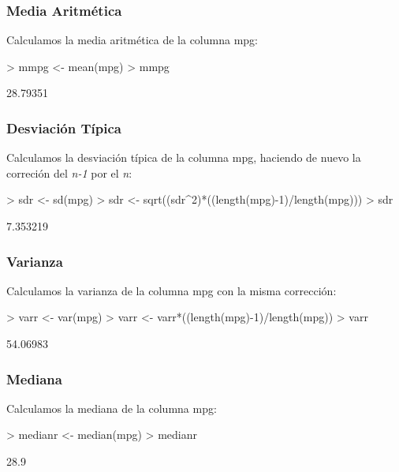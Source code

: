 \documentclass [a4paper] {article}
\begin{document}
\subsubsection{Media Aritmética}
Calculamos la media aritmética de la columna mpg:
\begin{Schunk}
\begin{Sinput}
> mmpg <- mean(mpg)
> mmpg
\end{Sinput}
\begin{Soutput}
[1] 28.79351
\end{Soutput}
\end{Schunk}

\subsubsection{Desviación Típica}
Calculamos la desviación típica de la columna mpg, haciendo de nuevo la correción del \textit{n-1} por el \textit{n}:
\begin{Schunk}
\begin{Sinput}
> sdr <- sd(mpg)
> sdr <- sqrt((sdr^2)*((length(mpg)-1)/length(mpg)))
> sdr
\end{Sinput}
\begin{Soutput}
[1] 7.353219
\end{Soutput}
\end{Schunk}

\subsubsection{Varianza}
Calculamos la varianza de la columna mpg con la misma corrección:
\begin{Schunk}
\begin{Sinput}
> varr <- var(mpg)
> varr <- varr*((length(mpg)-1)/length(mpg))
> varr
\end{Sinput}
\begin{Soutput}
[1] 54.06983
\end{Soutput}
\end{Schunk}

\subsubsection{Mediana}
Calculamos la mediana de la columna mpg:
\begin{Schunk}
\begin{Sinput}
> medianr <- median(mpg)
> medianr
\end{Sinput}
\begin{Soutput}
[1] 28.9
\end{Soutput}
\end{Schunk}
\newpage
\end{document}
